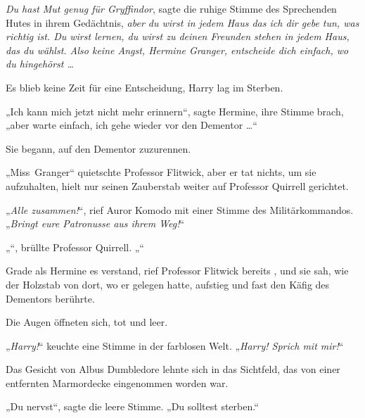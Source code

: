 \emph{Du hast Mut genug für Gryffindor}, sagte die ruhige Stimme des Sprechenden Hutes in ihrem Gedächtnis, \emph{aber du wirst in jedem Haus das ich dir gebe tun, was richtig ist. Du wirst lernen, du wirst zu deinen Freunden stehen in jedem Haus, das du wählst. Also keine Angst, Hermine Granger, entscheide dich einfach, wo du hingehörst …}

Es blieb keine Zeit für eine Entscheidung, Harry lag im Sterben.

„Ich kann mich jetzt nicht mehr erinnern“, sagte Hermine, ihre Stimme brach, „aber warte einfach, ich gehe wieder vor den Dementor …“

Sie begann, auf den Dementor zuzurennen.

„Miss~Granger“ quietschte Professor Flitwick, aber er tat nichts, um sie aufzuhalten, hielt nur seinen Zauberstab weiter auf Professor Quirrell gerichtet.

„\emph{Alle zusammen!}“, rief Auror Komodo mit einer Stimme des Militärkommandos.
„\emph{Bringt eure Patronusse aus ihrem Weg!}“

„“, brüllte Professor Quirrell.
„“

Grade als Hermine es verstand, rief Professor Flitwick bereits , und sie sah, wie der Holzstab von dort, wo er gelegen hatte, aufstieg und fast den Käfig des Dementors berührte.

\later

Die Augen öffneten sich, tot und leer.

„\emph{Harry!}“ keuchte eine Stimme in der farblosen Welt.
„\emph{Harry! Sprich mit mir!}“

Das Gesicht von Albus Dumbledore lehnte sich in das Sichtfeld, das von einer entfernten Marmordecke eingenommen worden war.

„Du nervst“, sagte die leere Stimme.
„Du solltest sterben.“

